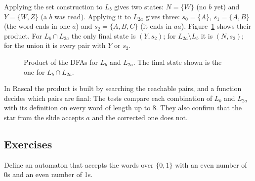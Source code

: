 Applying the set construction to $L_b$ gives two states: $N = \{W\}$ (no $b$
yet) and $Y = \{W, Z\}$ (a $b$ was read). Applying it to $L_{2a}$ gives three:
$s_0 = \{A\}$, $s_1 = \{A, B\}$ (the word ends in one $a$) and $s_2 = \{A, B,
C\}$ (it ends in $aa$). Figure~\ref{fig:product} shows their product. For
$L_b \cap L_{2a}$ the only final state is $(Y, s_2)$; for $L_{2a} \setminus L_b$
it is $(N, s_2)$; for the union it is every pair with $Y$ or $s_2$.

\begin{figure}[h]
\centering
{}
\caption{Product of the DFAs for $L_b$ and $L_{2a}$. The final state shown is the one for $L_b \cap L_{2a}$.}
\label{fig:product}
\end{figure}

In Rascal the product is built by searching the reachable pairs, and a
function decides which pairs are final:
The tests compare each combination of $L_b$ and $L_{2a}$ with its definition
on every word of length up to 8. They also confirm that the star from the
slide accepts $a$ and the corrected one does not.

\subsection{Exercises}

\begin{exercise}
Define an automaton that accepts the words over $\{0, 1\}$ with an even number
of 0s and an even number of 1s.
\end{exercise}

